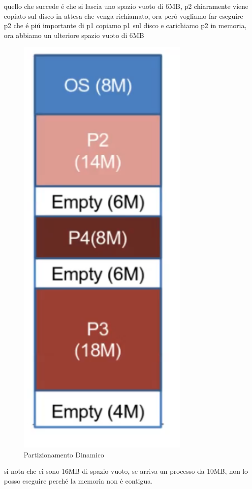     quello che succede é che si lascia uno spazio vuoto di 6MB, p2 chiaramente viene copiato
    sul disco in attesa che venga richiamato, ora peró vogliamo far eseguire p2 che é piú importante
    di p1 copiamo p1 sul disco e carichiamo p2 in memoria, ora abbiamo un ulteriore spazio vuoto di 6MB
    \begin{figure}
        \centering
        \includegraphics[width=0.75\textwidth]{immagini/EsempioPartizionamentoDinamico3}
        \caption{Partizionamento Dinamico}
    \end{figure}
    si nota che ci sono 16MB di spazio vuoto, se arriva un processo da 10MB, non
    lo posso eseguire perché la memoria non é contigua.
